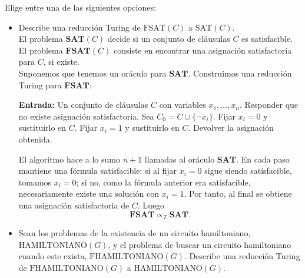 \documentclass[12pt]{article}
\begin{document}
    \begin{ejercicio}[1.3 puntos]
        Elige entre una de las siguientes opciones:

        \begin{itemize}
            \item Describe una reducción Turing de $\text{FSAT}(C)$ a $\text{SAT}(C)$. \\
            
            El problema $\textbf{SAT}(C)$ decide si un conjunto de cláusulas $C$ es satisfacible. El problema
            $\textbf{FSAT}(C)$ consiste en encontrar una asignación satisfactoria para $C$, si existe. \\

            Suponemos que tenemos un oráculo para $\textbf{SAT}$. Construimos una reducción Turing para
            $\textbf{FSAT}$:

            \begin{algorithm}
            \caption{Reducción Turing de $\textbf{FSAT}$ a $\textbf{SAT}$}
            \begin{algorithmic}
            \State \textbf{Entrada:} Un conjunto de cláusulas $C$ con variables $x_1,\dots,x_n$.
                \State Responder que no existe asignación satisfactoria.
            \EndIf
                \State Sea $C_0=C\cup\{\neg x_i\}$.
                    \State Fijar $x_i=0$ y sustituirlo en $C$.
                \Else
                    \State Fijar $x_i=1$ y sustituirlo en $C$.
                \EndIf
            \EndFor
            \State Devolver la asignación obtenida.
            \end{algorithmic}
            \end{algorithm}

            El algoritmo hace a lo sumo $n+1$ llamadas al oráculo $\textbf{SAT}$. En cada paso mantiene una
            fórmula satisfacible: si al fijar $x_i=0$ sigue siendo satisfacible, tomamos $x_i=0$; si no,
            como la fórmula anterior era satisfacible, necesariamente existe una solución con $x_i=1$.
            Por tanto, al final se obtiene una asignación satisfactoria de $C$. Luego
            $$
            \textbf{FSAT} \propto_T \textbf{SAT}.
            $$

            \newpage

            \item Sean los problemas de la existencia de un circuito hamiltoniano, $\text{HAMILTONIANO}(G)$, y el problema de buscar un circuito hamiltoniano 
            cuando este exista, $\text{FHAMILTONIANO}(G)$. Describe una reducción Turing de $\text{FHAMILTONIANO}(G)$ a $\text{HAMILTONIANO}(G)$. \\


\end{itemize}
\end{ejercicio}
\end{document}
